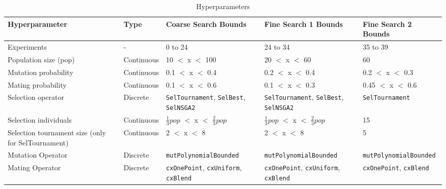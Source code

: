 \begin{table}[]
    \centering
    \onehalfspacing
    \caption{Hyperparameters}
	\label{tab:hyperparameter_search}
    \footnotesize
    \begin{tabular}{p{4cm}lp{3.4cm}p{3.4cm}p{3.4cm}}
    \hline 
    \textbf{Hyperparameter}& \textbf{Type} & \textbf{Coarse Search Bounds} & \textbf{Fine Search 1 Bounds} & \textbf{Fine Search 2 Bounds} \\
    \hline
    Experiments & - & 0 to 24 & 24 to 34 & 35 to 39 \\ 
    \hline
    Population size (pop) & Continuous & 10 $<$ x $<$ 100 & 20 $<$ x $<$ 60 & 60 \\ 
    Mutation probability & Continuous & 0.1 $<$ x $<$ 0.4 & 0.2 $<$ x $<$ 0.4& 0.2 $<$ x $<$ 0.3\\
    Mating probability & Continuous & 0.1 $<$ x $<$ 0.6 &  0.1 $<$ x $<$ 0.3 &  0.45 $<$ x $<$ 0.6\\
    Selection operator & Discrete & \texttt{SelTournament}, \texttt{SelBest}, \texttt{SelNSGA2} & \texttt{SelTournament}, \texttt{SelBest}, \texttt{SelNSGA2}& \texttt{SelTournament}\\
    Selection individuals & Continuous & $\frac{1}{3}pop$ $<$ x $<$ $\frac{2}{3}pop$ & $\frac{1}{3}pop$ $<$ x $<$ $\frac{2}{3}pop$ & 15\\
    Selection tournament size (only for SelTournament) & Continuous & 2 $<$ x $<$ 8 &2 $<$ x $<$ 8&5\\
    Mutation Operator & Discrete & \texttt{mutPolynomialBounded} &\texttt{mutPolynomialBounded}&\texttt{mutPolynomialBounded}\\
    Mating Operator & Discrete& \texttt{cxOnePoint}, \texttt{cxUniform}, \texttt{cxBlend} &\texttt{cxOnePoint}, \texttt{cxUniform}, \texttt{cxBlend}&\texttt{cxOnePoint}, \texttt{cxBlend}\\ 
    \hline
    \end{tabular}
\end{table}

